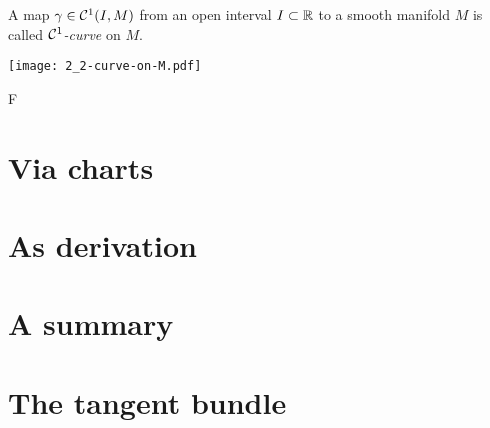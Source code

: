 A map $\gamma\in\mathcal{C}^1(I, M)$ from an open interval $I\subset\mathbb{R}$ to a smooth manifold $M$ is called \emph{$\mathcal{C}^1$-curve} on $M$.
\begin{marginfigure}
  \texttt{[image: 2\_2-curve-on-M.pdf]}
\end{marginfigure}
F
\section{Via charts}
\section{As derivation}

\section{A summary}

\section{The tangent bundle}